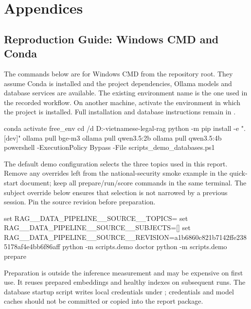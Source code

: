\documentclass[11pt,a4paper,oneside]{report}
\newcommand{\code}[1]{\texttt{\detokenize{#1}}}
\begin{document}
\endgroup
\chapter{Appendices}\label{ch:appendices}
\section{Reproduction Guide: Windows CMD and Conda}
The commands below are for Windows CMD from the repository root. They assume Conda is installed and the project dependencies, Ollama models and database services are available. The existing environment name \code{free_env} is the one used in the recorded workflow. On another machine, activate the environment in which the project is installed. Full installation and database instructions remain in .

\begin{commands}
conda activate free_env
cd /d D:\dsp-vietnamese-legal-rag
python -m pip install -e ".[dev]"
ollama pull bge-m3
ollama pull qwen3.5:2b
ollama pull qwen3.5:4b
powershell -ExecutionPolicy Bypass -File scripts\start_demo_databases.ps1
\end{commands}
The default demo configuration selects the three topics used in this report. Remove any overrides left from the national-security smoke example in the quick-start document; keep all prepare/run/score commands in the same terminal. The subject override below ensures that selection is not narrowed by a previous session. Pin the source revision before preparation.
\begin{commands}
set RAG__DATA_PIPELINE__SOURCE__TOPICS=
set RAG__DATA_PIPELINE__SOURCE__SUBJECTS=[]
set RAG__DATA_PIPELINE__SOURCE__REVISION=a1b6860c821b7142ffe2385178af4e4bb6f86aff
python -m scripts.demo doctor
python -m scripts.demo prepare
\end{commands}
Preparation is outside the inference measurement and may be expensive on first use. It reuses prepared embeddings and healthy indexes on subsequent runs. The database startup script writes local credentials under ; credentials and model caches should not be committed or copied into the report package.
\end{document}
